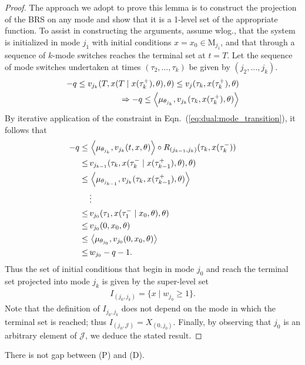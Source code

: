     \begin{proof}
    The approach we adopt to prove this lemma is to construct the projection of the BRS on any mode and show that it is a 1-level set of the appropriate function. To assist in constructing the arguments, assume wlog., that the system is initialized in mode $j_1$ with initial conditions $x=x_0\in \mathrm M_{j_1}$, and that through a sequence of $k$-mode switches reaches the terminal set at $t=T$. Let the sequence of mode switches undertaken at times $(\tau_2,\ldots,\tau_{k})$ be given by $(j_2,\ldots,j_{k})$.
    \begin{align}
      -q\le v_{j_k}(T,x(T\mid x(\tau_k^+),\theta),\theta)\le v_j(\tau_k,x(\tau_k^+),\theta)\\
      \Rightarrow -q\le \left\langle \mu_{\theta_{j_k}},v_{j_k}(\tau_k,x(\tau_k^+),\theta)\right\rangle
    \end{align}
    By iterative application of the constraint in Eqn.~(\ref{eq:dual:mode_transition}), it follows that
    \begin{align}
      -q\le&\, \left\langle \mu_{\theta_{j_k}},v_{j_k}(t,x,\theta)\right\rangle\circ R_{(j_{k-1},j_{k})}(\tau_{k},x(\tau_{k}^-))\\
      \le&\, v_{j_{k-1}}(\tau_{k},x(\tau_{k}^-\mid x(\tau_{k-1}^+),\theta),\theta)\\
      \le &\, \left\langle \mu_{\theta_{j_{k-1}}},v_{j_k}(\tau_k,x(\tau_{k-1}^+),\theta)\right\rangle\\\nonumber
      &\,\vdots\\
      \le &\,v_{j_0}(\tau_1,x(\tau_1^-\mid x_0,\theta),\theta)\\
      \le &\,v_{j_0}(0,x_0,\theta)\\
      \le &\,\left\langle \mu_{\theta_{j_0}},v_{j_0}(0,x_0,\theta)\right\rangle\\
      \le &\, w_{j_0}-q-1.
    \end{align}
    Thus the set of initial conditions that begin in mode $j_0$ and reach the terminal set projected into mode $j_k$ is given by the super-level set
    \begin{align}
      I_{(j_0,j_k)}=\{x\mid w_{j_0}\ge 1\}.
    \end{align}
    Note that the definition of $I_{j_0,j_k}$ does not depend on the mode in which the terminal set is reached; thus \mbox{$I_{(j_0,\mathcal J)}=X_{(0,j_0)}$}. Finally, by observing that $j_0$ is an arbitrary element of $\mathcal J$, we deduce the stated result.
    \end{proof}
    \begin{lemma}
      There is not gap between (P) and (D).
    \end{lemma}

